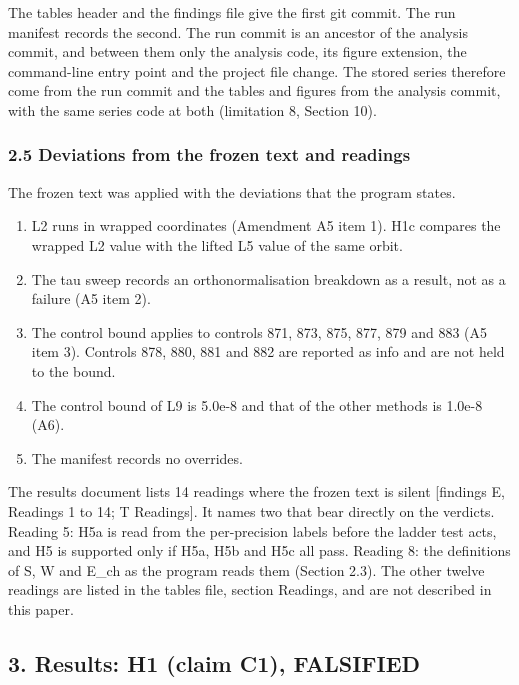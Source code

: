 \documentclass[
  11pt,
]{article}
\providecommand{\tightlist}{%
  \setlength{\itemsep}{0pt}\setlength{\parskip}{0pt}}
\begin{document}
The tables header and the findings file give the first git commit. The
run manifest records the second. The run commit is an ancestor of the
analysis commit, and between them only the analysis code, its figure
extension, the command-line entry point and the project file change. The
stored series therefore come from the run commit and the tables and
figures from the analysis commit, with the same series code at both
(limitation 8, Section 10).

\subsubsection{2.5 Deviations from the frozen text and
readings}\label{deviations-from-the-frozen-text-and-readings}

The frozen text was applied with the deviations that the program states.

\begin{enumerate}
\def\labelenumi{\arabic{enumi}.}
\tightlist
\item
  L2 runs in wrapped coordinates (Amendment A5 item 1). H1c compares the
  wrapped L2 value with the lifted L5 value of the same orbit.
\item
  The tau sweep records an orthonormalisation breakdown as a result, not
  as a failure (A5 item 2).
\item
  The control bound applies to controls 871, 873, 875, 877, 879 and 883
  (A5 item 3). Controls 878, 880, 881 and 882 are reported as info and
  are not held to the bound.
\item
  The control bound of L9 is 5.0e-8 and that of the other methods is
  1.0e-8 (A6).
\item
  The manifest records no overrides.
\end{enumerate}

The results document lists 14 readings where the frozen text is silent
{[}findings E, Readings 1 to 14; T Readings{]}. It names two that bear
directly on the verdicts. Reading 5: H5a is read from the per-precision
labels before the ladder test acts, and H5 is supported only if H5a, H5b
and H5c all pass. Reading 8: the definitions of S, W and E\_ch as the
program reads them (Section 2.3). The other twelve readings are listed
in the tables file, section Readings, and are not described in this
paper.

\subsection{3. Results: H1 (claim C1),
FALSIFIED}\label{results-h1-claim-c1-falsified}
\end{document}

